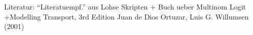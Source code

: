 %
%

% 


Literatur: ``Literatuempf.'' aus Lohse Skripten + Buch ueber Multinom
Logit
+Modelling Transport, 3rd Edition
Juan de Dios Ortuzar, Luis G. Willumsen (2001)

\printindex
\printglossary



